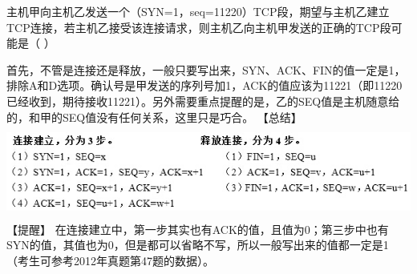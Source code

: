 \question 主机甲向主机乙发送一个（SYN=1，seq=11220）TCP段，期望与主机乙建立TCP连接，若主机乙接受该连接请求，则主机乙向主机甲发送的正确的TCP段可能是（
）
\par{}
\begin{solution}首先，不管是连接还是释放，一般只要写出来，SYN、ACK、FIN的值一定是1，排除A和D选项。确认号是甲发送的序列号加1，ACK的值应该为11221（即11220已经收到，期待接收11221）。另外需要重点提醒的是，乙的SEQ值是主机随意给的，和甲的SEQ值没有任何关系，这里只是巧合。
【总结】
\includegraphics[width=6.23958in,height=1.20833in]{computerassets/0349051efcbc98e2d82b387bf89b9028.jpeg}
【提醒】
在连接建立中，第一步其实也有ACK的值，且值为0；第三步中也有SYN的值，其值也为0，但是都可以省略不写，所以一般写出来的值都一定是1（考生可参考2012年真题第47题的数据）。
\end{solution}
